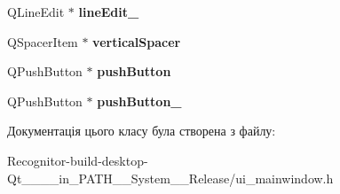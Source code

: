 \begin{DoxyCompactItemize}
\item 
\hypertarget{classUi__MainWindow_a21de642ed1cae607a93ed897a08bfe09}{Q\-Line\-Edit $\ast$ {\bfseries line\-Edit\-\_}}\label{classUi__MainWindow_a21de642ed1cae607a93ed897a08bfe09}

\item 
\hypertarget{classUi__MainWindow_a8384329c3663ff274e926a12024aab52}{Q\-Spacer\-Item $\ast$ {\bfseries vertical\-Spacer}}\label{classUi__MainWindow_a8384329c3663ff274e926a12024aab52}

\item 
\hypertarget{classUi__MainWindow_ad332d93084584930878f1daf5f84cdbf}{Q\-Push\-Button $\ast$ {\bfseries push\-Button}}\label{classUi__MainWindow_ad332d93084584930878f1daf5f84cdbf}

\item 
\hypertarget{classUi__MainWindow_a59a7d8124bce933d63f53f2153d447b4}{Q\-Push\-Button $\ast$ {\bfseries push\-Button\-\_}}\label{classUi__MainWindow_a59a7d8124bce933d63f53f2153d447b4}

\end{DoxyCompactItemize}


Документація цього класу була створена з файлу\-:\begin{DoxyCompactItemize}
\item 
Recognitor-\/build-\/desktop-\/\-Qt\-\_\-\_\-\_\-\_\-in\-\_\-\-P\-A\-T\-H\-\_\-\-\_\-\-System\-\_\-\-\_\-\-Release/ui\-\_\-mainwindow.\-h\end{DoxyCompactItemize}
